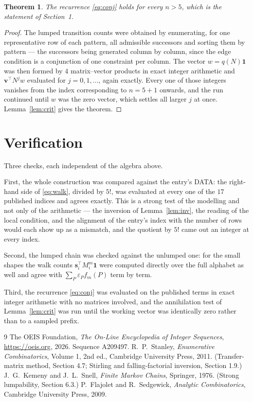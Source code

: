 \documentclass[11pt,a4paper]{article}
\theoremstyle{plain}
\newtheorem{theorem}{Theorem}
\theoremstyle{definition}
\begin{document}
\begin{theorem}
The recurrence \eqref{eq:conj} holds for every $n>5$, which is the statement of
Section~1.
\end{theorem}

\begin{proof}
The lumped transition counts were obtained by enumerating, for one representative row of
each pattern, all admissible successors and sorting them by pattern --- the successors being
generated column by column, since the edge condition is a conjunction of one constraint per
column. The vector $w=q(N)\mathbf{1}$ was then formed by $4$ matrix--vector products
in exact integer arithmetic and $\mathbf{v}^{\!\top}N^{j}w$ evaluated for
$j=0,1,\dots$, again exactly. Every one of those integers vanishes from the index
corresponding to $n=5+1$ onwards, and the run continued until $w$ was the zero vector,
which settles all larger $j$ at once. Lemma~\ref{lem:crit} gives the theorem.
\end{proof}

\section{Verification}

Three checks, each independent of the algebra above.

First, the whole construction was compared against the entry's DATA: the right-hand side of
\eqref{eq:walk}, divided by $5!$, was evaluated at every one of the $17$
published indices and agrees exactly. This is a strong test of the modelling and not only of
the arithmetic --- the inversion of Lemma~\ref{lem:inv}, the reading of the local
condition, and the alignment of the entry's index with the number of rows would each
show up as a mismatch, and the quotient by $5!$ came out an integer at every index.

Second, the lumped chain was checked against the unlumped one: for the small shapes the walk
counts $\mathbf{s}_i^{\!\top}M_i^{m}\mathbf{1}$ were computed directly over the full
alphabet as well and agree with $\sum_P\varepsilon_Pf_m(P)$ term by term.

Third, the recurrence \eqref{eq:conj} was evaluated on the published terms in exact integer
arithmetic with no matrices involved, and the annihilation test of Lemma~\ref{lem:crit} was
run until the working vector was identically zero rather than to a sampled prefix.

\begin{thebibliography}{9}
 The OEIS Foundation, \emph{The On-Line Encyclopedia of Integer
Sequences}, \url{https://oeis.org}, 2026. Sequence A209497.
 R.~P.~Stanley, \emph{Enumerative Combinatorics}, Volume 1, 2nd ed.,
Cambridge University Press, 2011. (Transfer-matrix method, Section 4.7; Stirling and
falling-factorial inversion, Section 1.9.)
 J.~G.~Kemeny and J.~L.~Snell, \emph{Finite Markov Chains}, Springer,
1976. (Strong lumpability, Section 6.3.)
 P.~Flajolet and R.~Sedgewick, \emph{Analytic Combinatorics}, Cambridge
University Press, 2009.
\end{thebibliography}
\end{document}
